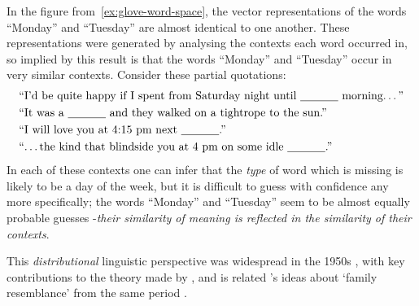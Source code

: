 \documentclass{ucetd}
\begin{document}
\begin{example}
  In the figure from~\autoref{ex:glove-word-space}, the vector representations of the words ``Monday'' and ``Tuesday'' are almost identical to one another. These representations were generated by analysing the contexts each word occurred in, so implied by this result is that the words ``Monday'' and ``Tuesday'' occur in very similar contexts. Consider these partial quotations\footnotemark:
  \begin{align}
    &\text{``I'd be quite happy if I spent from Saturday night until \underline{~~~~~~~~~~} morning\dots''}\label{eq:distrib-hyp-1}\\
    &\text{``It was a \underline{~~~~~~~~~~} and they walked on a tightrope to the sun.''}\label{eq:distrib-hyp-2}\\
    &\text{``I will love you at 4:15 pm next \underline{~~~~~~~~~~}.''}\label{eq:distrib-hyp-3}\\
    &\text{``\dots the kind that blindside you at 4 pm on some idle \underline{~~~~~~~~~~}.''}\label{eq:distrib-hyp-4}
  \end{align}
  In each of these contexts one can infer that the \emph{type} of word which is missing is likely to be a day of the week, but it is difficult to guess with confidence any more specifically; the words ``Monday'' and ``Tuesday'' seem to be almost equally probable guesses -\emph{their similarity of meaning is reflected in the similarity of their contexts}.
\end{example}
This \emph{distributional} linguistic perspective was widespread in the 1950s \parencite{jurafsky21-speec}, with key contributions to the theory made by \textcite{joos-1950-description-of-language, harris-1954-distrib-struct, firth-1957-a-syn-of-lin}, and is related \citeauthor{wittgenstein53-philos}'s \parencite*{wittgenstein53-philos} ideas about `family resemblance' from the same period \parencite{turney10-from-frequen-to-meanin}.
\end{document}
